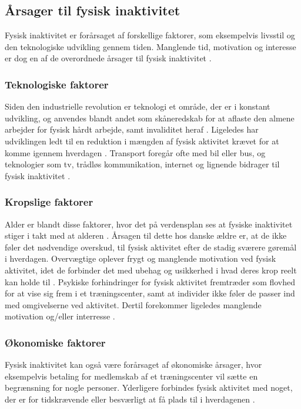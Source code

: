 \subsection{Årsager til fysisk inaktivitet}
Fysisk inaktivitet er forårsaget af forskellige faktorer, som eksempelvis livsstil og den teknologiske udvikling gennem tiden. Manglende tid, motivation og interesse er dog en af de overordnede årsager til fysisk inaktivitet \citep{ottesen2005}.  

\subsubsection{Teknologiske faktorer}  
Siden den industrielle revolution er teknologi et område, der er i konstant udvikling, og anvendes blandt andet som skåneredskab for at aflaste den almene arbejder for fysisk hårdt arbejde, samt invaliditet heraf \citep{hallal2012}. 
Ligeledes har udviklingen ledt til en reduktion i mængden af fysisk aktivitet krævet for at komme igennem hverdagen \citep{hallal2012, motionsraad2007}. Transport foregår ofte med bil eller bus, og teknologier som tv, trådløs kommunikation, internet og lignende bidrager til fysisk inaktivitet \citep{hallal2012}.  

\subsubsection{Kropslige faktorer}
Alder er blandt disse faktorer, hvor det på verdensplan ses at fysiske inaktivitet stiger i takt med at alderen \citep{guthold2008}. 
Årsagen til dette hos danske ældre er, at de ikke føler det nødvendige overskud, til fysisk aktivitet efter de stadig sværere gøremål i hverdagen. 
Overvægtige oplever frygt og manglende motivation ved fysisk aktivitet, idet de forbinder det med ubehag og usikkerhed i hvad deres krop reelt kan holde til \citep{ottesen2005}. 
Psykiske forhindringer for fysisk aktivitet fremtræder som flovhed for at vise sig frem i et træningscenter, samt at individer ikke føler de passer ind med omgivelserne ved aktivitet. 
Dertil forekommer ligeledes manglende motivation og/eller interresse \citep{ottesen2005}.

\subsubsection{Økonomiske faktorer}
Fysisk inaktivitet kan også være forårsaget af økonomiske årsager, hvor eksempelvis betaling for medlemskab af et træningscenter vil sætte en begrænsning for nogle personer. Yderligere forbindes fysisk aktivitet med noget, der er for tidskrævende eller besværligt at få plads til i hverdagenen \citep{ottesen2005}.